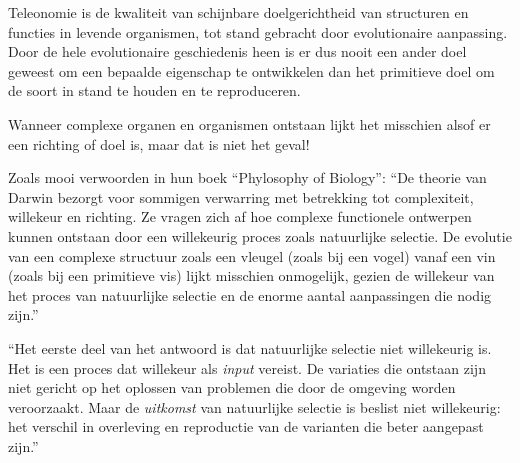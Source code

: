 \documentclass[
  11pt,
]{book}
\begin{document}
Teleonomie is de kwaliteit van schijnbare doelgerichtheid van structuren en functies in levende organismen, tot stand gebracht door evolutionaire aanpassing. Door de hele evolutionaire geschiedenis heen is er dus nooit een ander doel geweest om een bepaalde eigenschap te ontwikkelen dan het primitieve doel om de soort in stand te houden en te reproduceren.

Wanneer complexe organen en organismen ontstaan lijkt het misschien alsof er een richting of doel is, maar dat is niet het geval!

Zoals \citet{rosenberg2008} mooi verwoorden in hun boek ``Phylosophy of Biology'': ``De theorie van Darwin bezorgt voor sommigen verwarring met betrekking tot complexiteit, willekeur en richting. Ze vragen zich af hoe complexe functionele ontwerpen kunnen ontstaan door een willekeurig proces zoals natuurlijke selectie. De evolutie van een complexe structuur zoals een vleugel (zoals bij een vogel) vanaf een vin (zoals bij een primitieve vis) lijkt misschien onmogelijk, gezien de willekeur van het proces van natuurlijke selectie en de enorme aantal aanpassingen die nodig zijn.''

``Het eerste deel van het antwoord is dat natuurlijke selectie niet willekeurig is. Het is een proces dat willekeur als \emph{input} vereist. De variaties die ontstaan zijn niet gericht op het oplossen van problemen die door de omgeving worden veroorzaakt. Maar de \emph{uitkomst} van natuurlijke selectie is beslist niet willekeurig: het verschil in overleving en reproductie van de varianten die beter aangepast zijn.''
\end{document}
